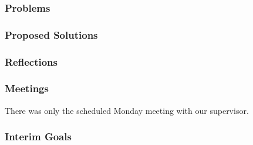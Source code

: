 \subsubsection{Problems}


\subsubsection{Proposed Solutions}


\subsubsection{Reflections}


\subsubsection{Meetings}

    There was only the scheduled Monday meeting with our supervisor.

\subsubsection{Interim Goals}


